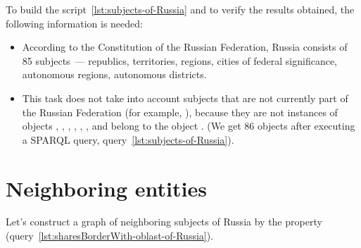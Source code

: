 To build the script~\ref{lst:subjects-of-Russia} and to verify the results obtained, the following information is needed:
\begin{itemize}
\item According to the Constitution of the Russian Federation, Russia consists of 85 subjects~--- republics, territories, regions, cities of federal significance, autonomous regions, autonomous districts.
  \item This task does not take into account subjects that are not currently part of the Russian Federation (for example, ), because they are not instances of objects , , , , , , and belong to the object . (We get 86 objects after executing a SPARQL query, query~\ref{lst:subjects-of-Russia}).
\end{itemize}


\section{Neighboring entities}

Let's construct a graph of neighboring subjects of Russia by the property  (query~\ref{lst:sharesBorderWith-oblast-of-Russia}).

